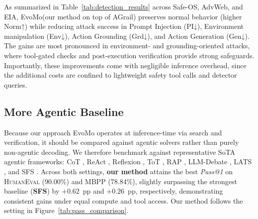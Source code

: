 \documentclass[11pt]{article}
\theoremstyle{definition}
\theoremstyle{remark}
\newcommand{\ourmethod}{{\fontfamily{lmtt}\selectfont EvoMo}\xspace}
\begin{document}
As summarized in Table~\ref{tab:detection_results} across Safe-OS, AdvWeb, and EIA, \ourmethod (our method on top of AGrail) preserves normal behavior (higher Norm↑) while reducing attack success in Prompt Injection (PI↓), Environment manipulation (Env↓), Action Grounding (Grd↓), and Action Generation (Gen↓). The gains are most pronounced in environment- and grounding-oriented attacks, where tool-gated checks and post-execution verification provide strong safeguards. Importantly, these improvements come with negligible inference overhead, since the additional costs are confined to lightweight safety tool calls and detector queries.

\subsection{More Agentic Baseline}
Because our approach \ourmethod operates at inference-time via search and verification, it should be compared against agentic solvers rather than purely non-agentic decoding. We therefore benchmark against representative SoTA agentic frameworks: CoT \citep{wei2022chain}, ReAct \citep{yao2023react}, Reflexion \citep{shinn2023reflexion}, ToT \citep{yao2023tree}, RAP \citep{hao2023reasoning}, LLM-Debate \citep{du2023improving}, LATS \citep{zhou2024language}, and SFS \citep{light2025sfs}. Across both settings, \textbf{our method} attains the best \textit{Pass@1} on \textsc{HumanEval} (90.00\%) and \textsc{MBPP} (78.84\%), slightly surpassing the strongest baseline (\textbf{SFS}) by $+0.62$\, pp and $+0.26$\, pp, respectively, demonstrating consistent gains under equal compute and tool access. Our method follows the setting in Figure~\ref{tab:pass_comparison}.
\end{document}
